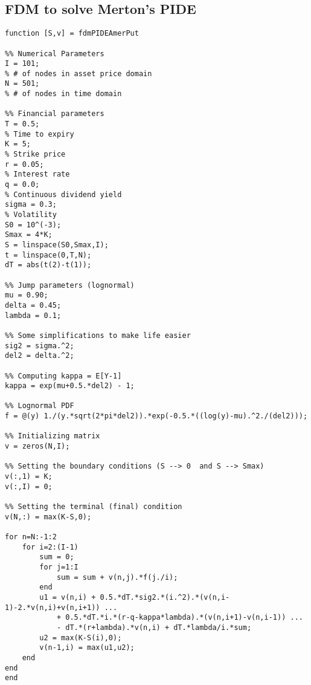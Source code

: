 \subsection{FDM to solve Merton's PIDE}
\begin{lstlisting}
function [S,v] = fdmPIDEAmerPut

%% Numerical Parameters
I = 101;                                                                  % # of nodes in asset price domain
N = 501;                                                                   % # of nodes in time domain

%% Financial parameters
T = 0.5;                                                                        % Time to expiry
K = 5;                                                                       % Strike price
r = 0.05;                                                                      % Interest rate
q = 0.0;                                                                      % Continuous dividend yield
sigma = 0.3;                                                                 % Volatility
S0 = 10^(-3);
Smax = 4*K;
S = linspace(S0,Smax,I);
t = linspace(0,T,N);
dT = abs(t(2)-t(1));

%% Jump parameters (lognormal)
mu = 0.90;
delta = 0.45;
lambda = 0.1;

%% Some simplifications to make life easier
sig2 = sigma.^2;
del2 = delta.^2;

%% Computing kappa = E[Y-1]
kappa = exp(mu+0.5.*del2) - 1;

%% Lognormal PDF
f = @(y) 1./(y.*sqrt(2*pi*del2)).*exp(-0.5.*((log(y)-mu).^2./(del2)));

%% Initializing matrix
v = zeros(N,I);

%% Setting the boundary conditions (S --> 0  and S --> Smax)
v(:,1) = K;
v(:,I) = 0;

%% Setting the terminal (final) condition
v(N,:) = max(K-S,0);

for n=N:-1:2
    for i=2:(I-1)
        sum = 0;
        for j=1:I
            sum = sum + v(n,j).*f(j./i);
        end
        u1 = v(n,i) + 0.5.*dT.*sig2.*(i.^2).*(v(n,i-1)-2.*v(n,i)+v(n,i+1)) ...
            + 0.5.*dT.*i.*(r-q-kappa*lambda).*(v(n,i+1)-v(n,i-1)) ...
            - dT.*(r+lambda).*v(n,i) + dT.*lambda/i.*sum;
        u2 = max(K-S(i),0);
        v(n-1,i) = max(u1,u2);
    end
end
end
\end{lstlisting}

